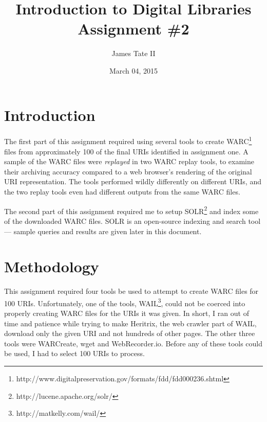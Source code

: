 \documentclass[a4paper,12pt]{article}
\begin{document}
\renewcommand{\thelstlisting}{\thesection-\arabic{lstlisting}}
\renewcommand{\thefigure}{\arabic{section}-\arabic{figure}}
\setlength{\floatsep}{0pt plus 2pt minus 2pt}

\title{Introduction to Digital Libraries Assignment \#2}
\date{March 04, 2015}
\author{James Tate II}
\maketitle

\section{Introduction}
The first part of this assignment required using several tools to create
WARC\footnote{http://www.digitalpreservation.gov/formats/fdd/fdd000236.shtml} files from approximately 100
of the final URIs identified in assignment one. A sample of the WARC files were \emph{replayed} in two WARC
replay tools, to examine their archiving accuracy compared to a web browser's rendering of the original URI
representation. The tools performed wildly differently on different URIs, and the two replay tools even
had different outputs from the same WARC files.

The second part of this assignment required me to setup SOLR\footnote{http://lucene.apache.org/solr/} and
index some of the downloaded WARC files. SOLR is an open-source indexing and search tool --- sample
queries and results are given later in this document.

\section{Methodology}
This assignment required four tools be used to attempt to create WARC files for 100 URIs. Unfortunately, one
of the tools, WAIL\footnote{http://matkelly.com/wail/}, could not be coerced into properly creating WARC
files for the URIs it was given. In short, I ran out of time and patience while trying to make Heritrix, the
web crawler part of WAIL, download only the given URI and not hundreds of other pages. The other three tools
were WARCreate, wget and WebRecorder.io. Before any of these tools could be used, I had to select 
100 URIs to process.
\end{document}
